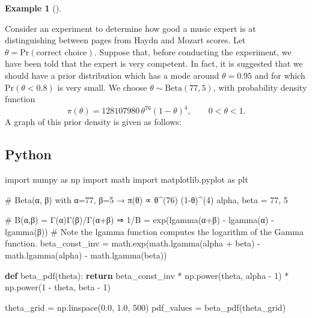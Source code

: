 \documentclass[
  letterpaper,
  DIV=11,
  numbers=noendperiod]{scrreprt}
\newenvironment{Shaded}{\begin{snugshade}}{\end{snugshade}}
\newcommand{\CommentTok}[1]{\textcolor[rgb]{0.37,0.37,0.37}{#1}}
\newcommand{\ControlFlowTok}[1]{\textcolor[rgb]{0.00,0.23,0.31}{\textbf{#1}}}
\newcommand{\DecValTok}[1]{\textcolor[rgb]{0.68,0.00,0.00}{#1}}
\newcommand{\FloatTok}[1]{\textcolor[rgb]{0.68,0.00,0.00}{#1}}
\newcommand{\ImportTok}[1]{\textcolor[rgb]{0.00,0.46,0.62}{#1}}
\newcommand{\KeywordTok}[1]{\textcolor[rgb]{0.00,0.23,0.31}{\textbf{#1}}}
\newcommand{\NormalTok}[1]{\textcolor[rgb]{0.00,0.23,0.31}{#1}}
\newcommand{\OperatorTok}[1]{\textcolor[rgb]{0.37,0.37,0.37}{#1}}
\theoremstyle{definition}
\newtheorem{example}{Example}[chapter]
\theoremstyle{plain}
\theoremstyle{definition}
\theoremstyle{remark}
\begin{document}
\begin{example}[]\protect\hypertarget{exm-music-expert}{}\label{exm-music-expert}

Consider an experiment to determine how good a music expert is at
distinguishing between pages from Haydn and Mozart scores. Let
\(\theta=\mathrm{Pr}(\text{correct choice})\). Suppose that, before
conducting the experiment, we have been told that the expert is very
competent. In fact, it is suggested that we should have a prior
distribution which has a mode around \(\theta=0.95\) and for which
\(\mathrm{Pr}(\theta<0.8)\) is very small. We choose
\(\theta\sim \textrm{Beta}(77,5)\), with probability density function \[
\pi(\theta)=128107980\,\theta^{76}(1-\theta)^4,\quad\quad 0<\theta<1.
\] A graph of this prior density is given as follows:

\subsection{Python}

\begin{Shaded}
\begin{Highlighting}[]
\ImportTok{import}\NormalTok{ numpy }\ImportTok{as}\NormalTok{ np}
\ImportTok{import}\NormalTok{ math}
\ImportTok{import}\NormalTok{ matplotlib.pyplot }\ImportTok{as}\NormalTok{ plt}

\CommentTok{\# Beta(α, β) with α=77, β=5  →  π(θ) ∝ θ\^{}(76) (1{-}θ)\^{}(4)}
\NormalTok{alpha, beta }\OperatorTok{=} \DecValTok{77}\NormalTok{, }\DecValTok{5}

\CommentTok{\# B(α,β) = Γ(α)Γ(β)/Γ(α+β)  ⇒  1/B = exp(lgamma(α+β) {-} lgamma(α) {-} lgamma(β))}
\CommentTok{\# Note the lgamma function computes the logarithm of the Gamma function.}
\NormalTok{beta\_const\_inv }\OperatorTok{=}\NormalTok{ math.exp(math.lgamma(alpha }\OperatorTok{+}\NormalTok{ beta) }\OperatorTok{{-}}\NormalTok{ math.lgamma(alpha) }\OperatorTok{{-}}\NormalTok{ math.lgamma(beta))}

\KeywordTok{def}\NormalTok{ beta\_pdf(theta):}
    \ControlFlowTok{return}\NormalTok{ beta\_const\_inv }\OperatorTok{*}\NormalTok{ np.power(theta, alpha }\OperatorTok{{-}} \DecValTok{1}\NormalTok{) }\OperatorTok{*}\NormalTok{ np.power(}\DecValTok{1} \OperatorTok{{-}}\NormalTok{ theta, beta }\OperatorTok{{-}} \DecValTok{1}\NormalTok{)}

\NormalTok{theta\_grid }\OperatorTok{=}\NormalTok{ np.linspace(}\FloatTok{0.0}\NormalTok{, }\FloatTok{1.0}\NormalTok{, }\DecValTok{500}\NormalTok{)}
\NormalTok{pdf\_values }\OperatorTok{=}\NormalTok{ beta\_pdf(theta\_grid)}


\end{Highlighting}
\end{Shaded}
\end{example}
\end{document}
